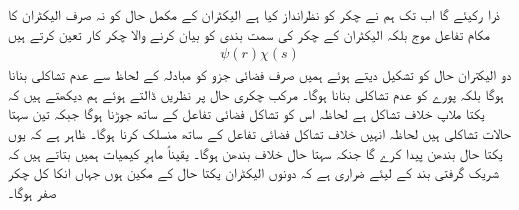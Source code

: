 ذرا رکیئے گا اب تک ہم نے چکر کو نظرانداز کیا ہے الیکٹران کے مکمل حال کو نہ صرف الیکٹران کا مکام تفاعل موج بلکہ الیکٹران کے  چکر کی سمت بندی کو بیان کرنے والا چکر کار تعین کرتے ہیں
\begin{align}
	\psi(r)\chi(s)
\end{align}
دو الیکتران حال کو تشکیل دیتے ہوئے ہمیں صرف فضائی جزو کو مبادلہ کے لحاظ سے عدم تشاکلی بنانا ہوگا بلکہ پورے کو عدم تشاکلی بنانا ہوگا۔ مرکب چکری حال  پر نظریں ڈالتے ہوئے ہم دیکھتے ہیں کہ یکتا ملاپ خلاف تشاکل ہے لحاظہ اس کو تشاکل فضائی تفاعل کے ساتھ جوڑنا ہوگا جبکہ تین سہتا حالات تشاکلی ہیں لحاظہ انہیں خلاف تشاکل فضائی تفاعل کے ساتھ منسلک کرنا ہوگا۔ ظاہر ہے کہ یوں یکتا حال بندھن پیدا کرے گا جنکہ سہتا حال خلاف بندھن ہوگا۔ یقیناً ماہرِ کیمیات ہمیں بتاتے ہیں کہ شریک گرفتی بند کے لیئے ضراری ہے کہ دونوں الیکٹران یکتا حال کے مکین ہوں جہاں انکا کل چکر صفر ہوگا۔

